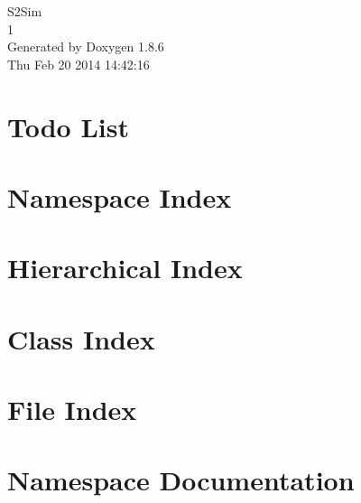 \documentclass[twoside]{book}
\newcommand{\clearemptydoublepage}{%
  \newpage{\pagestyle{empty}\cleardoublepage}%
}
\begin{document}
\hypersetup{pageanchor=false}
\begin{titlepage}
\vspace*{7cm}
\begin{center}%
{\Large S2\-Sim \\[1ex]\large 1 }\\
\vspace*{1cm}
{\large Generated by Doxygen 1.8.6}\\
\vspace*{0.5cm}
{\small Thu Feb 20 2014 14:42:16}\\
\end{center}
\end{titlepage}
\clearemptydoublepage
\tableofcontents
\clearemptydoublepage
{}
\hypersetup{pageanchor=true}

\chapter{Todo List}
\label{todo}
\hypertarget{todo}{}

\chapter{Namespace Index}

\chapter{Hierarchical Index}

\chapter{Class Index}

\chapter{File Index}

\chapter{Namespace Documentation}



\end{document}
